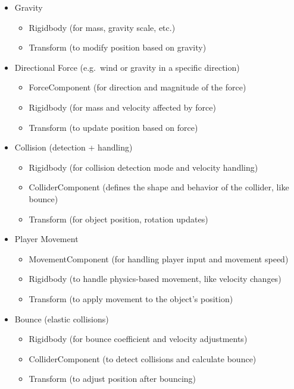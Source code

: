\documentclass{projdoc}
\begin{document}
\begin{itemize}
	\item Gravity
	\begin{itemize}
		\item Rigidbody (for mass, gravity scale, etc.)
		\item Transform (to modify position based on gravity)
	\end{itemize}

	\item Directional Force (e.g.~wind or gravity in a specific direction)
	\begin{itemize}
		\item ForceComponent (for direction and magnitude of the force)
		\item Rigidbody (for mass and velocity affected by force)
		\item Transform (to update position based on force)
	\end{itemize}

	\item Collision (detection + handling)
	\begin{itemize}
		\item Rigidbody (for collision detection mode and velocity handling)
		\item ColliderComponent (defines the shape and behavior of the collider, like bounce)
		\item Transform (for object position, rotation updates)
	\end{itemize}

	\item Player Movement
	\begin{itemize}
		\item MovementComponent (for handling player input and movement speed)
		\item Rigidbody (to handle physics-based movement, like velocity changes)
		\item Transform (to apply movement to the object's position)
	\end{itemize}

	\item Bounce (elastic collisions)
	\begin{itemize}
		\item Rigidbody (for bounce coefficient and velocity adjustments)
		\item ColliderComponent (to detect collisions and calculate bounce)
		\item Transform (to adjust position after bouncing)
	\end{itemize}


\end{itemize}
\end{document}
